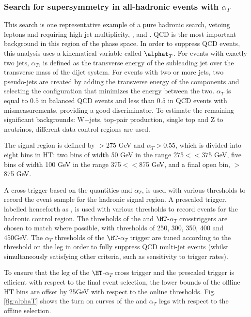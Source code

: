 \subsubsection{Search for supersymmetry in all-hadronic events with $\alpha_T$}

This search is one representative example of a pure hadronic search, vetoing
leptons and requiring high jet multiplicity, \MET, and \HT. QCD is the 
most important background in this region of the phase space. In order to suppress
QCD events, this analysis uses a kinematical variable called $\alphat_T$. For events
with exactly two jets, $\alpha_T$, is defined as the transverse energy of the subleading jet
over the transverse mass of the dijet system. For events with two or more jets,
two pseudo-jets are created by adding the transverse energy of the components and selecting
the configuration that minimizes the energy between the two. $\alpha_T$ is equal
to $0.5$ in balanced QCD events and less than $0.5$ in QCD events with mismeasurements,
providing a good discriminator. To estimate the remaining significant backgrounds: W+jets,
top-pair production, single top and Z to neutrinos, different data control regions are used.

The signal region is defined by \HT$>$275 GeV and $\alpha_T >$0.55, which is divided
into eight bins in HT: two bins of width 50 GeV in the range 275$<$\HT$<$375 GeV, five
bins of width 100 GeV in the range 375$<$\HT$<$875 GeV, and a final open bin, 
\HT$>$ 875 GeV. 

A cross trigger based on the quantities \HT and $\alpha_T$, is used with various
thresholds to record the event sample for the hadronic signal region. A prescaled
\HT trigger, labelled henceforth as \HT, is used with various thresholds to record
events for the hadronic control region. The \HT thresholds of the \HT and $\HT$-$\alpha_T$
crosstriggers are chosen to match where possible, with thresholds of 250,
300, 350, 400 and 450GeV. The $\alpha_T$ thresholds of the $\HT$-$\alpha_T$ trigger are
tuned according to the threshold on the \HT leg in order to fully suppress QCD
multi-jet events (whilst simultaneously satisfying other criteria, such as sensitivity
to trigger rates). 


To ensure that the \HT leg of the $\HT$-$\alpha_T$ cross trigger and the \HT prescaled trigger
is efficient with respect to the final event selection, the lower bounds of the offline
HT bins are offset by 25GeV with respect to the online thresholds. Fig. \ref{fig:alphaT} shows
the turn on curves of the \HT and $\alpha_T$ legs with respect to the offline selection.

